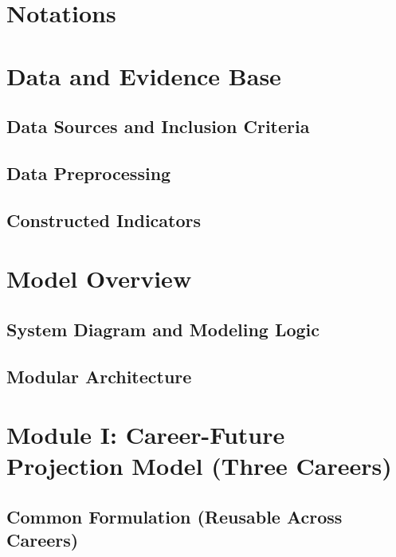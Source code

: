 \section{Notations}

\section{Data and Evidence Base}
\subsection{Data Sources and Inclusion Criteria}
\subsection{Data Preprocessing}
\subsection{Constructed Indicators}

\section{Model Overview}
\subsection{System Diagram and Modeling Logic}
\subsection{Modular Architecture}

\section{Module I: Career-Future Projection Model (Three Careers)}
\subsection{Common Formulation (Reusable Across Careers)}
